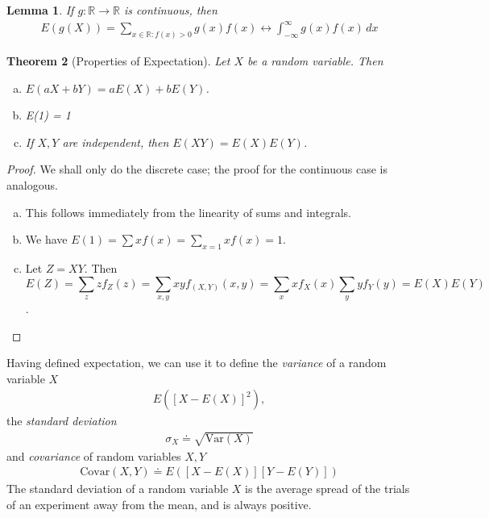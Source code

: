 \documentclass[12pt]{article}
\newcommand{\rr}{\mathbb{R}}
\newcommand{\var}{\text{Var}}
\newcommand{\covar}{\text{Covar}}
\theoremstyle{plain}
\newtheorem{theorem}{Theorem}
\newtheorem{lemma}[theorem]{Lemma}
\theoremstyle{definition}
\theoremstyle{remark}
\numberwithin{equation}{section}  %
\begin{document}
\begin{lemma}
If $g: \rr \to \rr$ is continuous, then
\begin{align*}
E(g(X)) = \sum_{x \in \rr: f(x) > 0} g(x) f(x) \longleftrightarrow
\int_{-\infty}^{\infty} g(x) f(x) \, dx
\end{align*}
\end{lemma}
\begin{theorem}[Properties of Expectation]
Let $X$ be a random variable. Then
\begin{enumerate}[a)]
	\item $E(aX + bY) = aE(X) + bE(Y)$.
	\item E(1) = 1
	\item If $X,Y$ are independent, then $E(XY) = E(X)E(Y)$.
\end{enumerate}
\end{theorem}
\begin{proof}
We shall only do the discrete case; the proof for the continuous case is
analogous.
\begin{enumerate}[a)]
\item This follows immediately from the linearity of sums and integrals.
\item
We have $E(1) = \sum x f(x) = \sum_{x = 1} x f(x) = 1.$
\item
Let $Z = XY$. Then
\[E(Z) = \sum_{z} z f_Z(z) = \sum_{x,y} xy f_{(X,Y)}(x,y) = \sum_x x f_X(x)
\sum_y y f_Y(y) = E(X) E(Y)\].
\end{enumerate}
\end{proof}
Having defined expectation, we can use it to define the
\emph{variance} of a random variable $X$
\begin{align*}
E([X - E(X)]^2),
\end{align*}
the \emph{standard deviation}
\begin{align*}
\sigma_X \doteq \sqrt{\var(X)}
\end{align*}
and \emph{covariance} of random variables $X, Y$
\begin{align*}
\covar(X,Y) \doteq E([X - E(X)][Y - E(Y)])
\end{align*}
The standard deviation of a random variable $X$ is the average spread of the
trials of an experiment away from the mean, and is always positive. 
\end{document}
